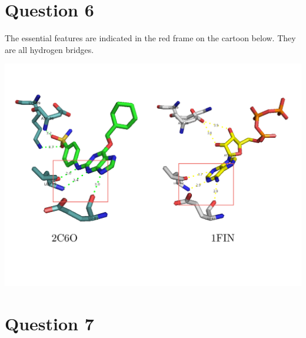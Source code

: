 \documentclass[11pt, a4paper,titlepage]{article}
\begin{document}
\section{Question 6}

The essential features are indicated in the red frame on the cartoon
below. They are all hydrogen bridges.

\includegraphics[width=17cm]{./Figures/6.pdf}

\section{Question 7}



\end{document}
